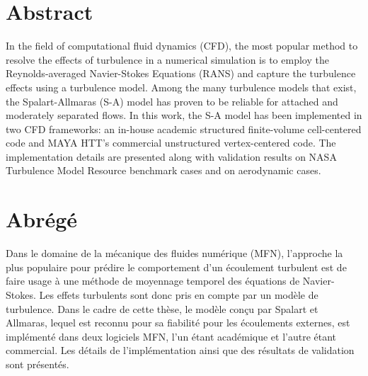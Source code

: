 \chapter*{Abstract}
In the field of computational fluid dynamics (CFD), the most popular
method to resolve the effects of turbulence in a numerical simulation is to
employ the Reynolds-averaged Navier-Stokes Equations (RANS) and
capture the turbulence effects using a turbulence model. Among the many
turbulence models that exist, the Spalart-Allmaras (S-A) model has proven to
be reliable for attached and moderately separated flows. In this work, the S-A model has been implemented in two CFD frameworks: an in-house academic
structured finite-volume cell-centered code and MAYA HTT’s commercial
unstructured vertex-centered code. The implementation details are presented along with validation results on NASA Turbulence Model Resource benchmark cases and on aerodynamic
cases.


\chapter*{Abrégé}
Dans le domaine de la mécanique des fluides numérique (MFN), l'approche la plus populaire pour prédire le comportement d'un écoulement turbulent est de faire usage à une méthode de moyennage temporel des équations de Navier-Stokes. Les effets turbulents sont donc pris en compte par un modèle de turbulence. Dans le cadre de cette thèse, le modèle conçu par Spalart et Allmaras, lequel est reconnu pour sa fiabilité pour les écoulements externes, est implémenté dans deux logiciels MFN, l'un étant académique et l'autre étant commercial. Les détails de l'implémentation ainsi que des résultats de validation sont présentés. 

